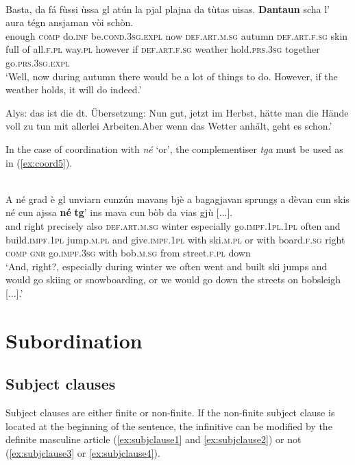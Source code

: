 \ea
\label{ex:coord4}
\\
\gll Basta, da fá fùssi ùssa gl atún la pjal plajna da tùtas uisas. \textbf{Dantaun} scha l' aura tégn ansjaman vòi schòn.\\
enough \textsc{comp} do.\textsc{inf} be\textsc{.cond.3sg.expl} now \textsc{def.art.m.sg} autumn \textsc{def.art.f.sg} skin full of all.\textsc{f.pl} way.\textsc{pl} however if \textsc{def.art.f.sg} weather hold.\textsc{prs.3sg} together go.\textsc{prs.3sg.expl} \\
\glt `Well, now during autumn there would be a lot of things to do. However, if the weather holds, it will do indeed.'
\z

\medskip
Alys: das ist die dt. Übersetzung: Nun gut, jetzt im Herbst, hätte man die Hände voll zu tun mit allerlei Arbeiten.Aber wenn das Wetter anhält, geht es schon.'

\medskip

In the case of coordination with \textit{né} `or', the complementiser \textit{tga} must be used as in (\ref{ex:coord5}).

\ea
\label{ex:coord5}
\\
\gll A né grad è gl unviarn cunzún mavanṣ bjè a bagagjavan sprungṣ a dèvan cun skis né cun ajssa \textbf{né} \textbf{tg}’ ins mava cun bòb da vias gjù [...].\\
and right precisely also \textsc{def.art.m.sg} winter especially go.\textsc{impf.1pl.1pl} often and build.\textsc{impf.1pl} jump.\textsc{m.pl} and give.\textsc{impf.1pl} with ski.\textsc{m.pl} or with board.\textsc{f.sg} right \textsc{comp} \textsc{gnr} go.\textsc{impf.3sg} with bob.\textsc{m.sg} from street.\textsc{f.pl} down\\
\glt `And, right?, especially during winter we often went and built ski jumps and would go skiing or snowboarding, or we would go down the streets on bobsleigh [...].'
\z


\section{Subordination}

\subsection{Subject clauses}
Subject clauses are either finite or non-finite. If the non-finite subject clause is located at the beginning of the sentence, the infinitive can be modified by the definite masculine article (\ref{ex:subjclause1} and \ref{ex:subjclause2}) or not (\ref{ex:subjclause3} or \ref{ex:subjclause4}).

